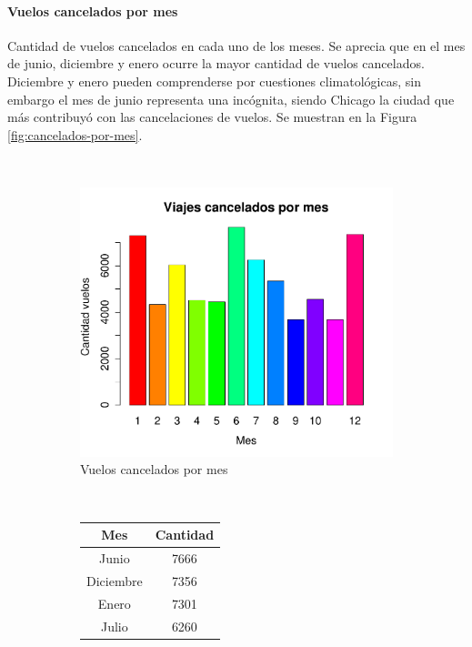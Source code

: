 \documentclass[12pt]{article}
\numberwithin{equation}{section}
\numberwithin{table}{section}
\numberwithin{figure}{section}
\begin{document}
\paragraph{Vuelos cancelados por mes}
Cantidad de vuelos cancelados en cada uno de los meses.
Se aprecia que en el mes de junio, diciembre y enero ocurre la mayor cantidad de vuelos cancelados.
Diciembre y enero pueden comprenderse por cuestiones climatológicas, sin embargo el mes de junio representa una incógnita, siendo Chicago la ciudad que más contribuyó con las cancelaciones de vuelos. Se muestran en la Figura \ref{fig:cancelados-por-mes}.

\begin{figure}
        \centering
        ~
        \begin{subfigure}[b]{0.6\textwidth}
                \includegraphics[width=1\columnwidth]{imagenes/cancelados/viajes-cancelados-por-mes}
                \caption{Vuelos cancelados por mes}
        \end{subfigure}
        ~
        \begin{subfigure}[b]{0.3\textwidth}
                \begin{tabular}{@{}cc@{}}
\toprule
\textbf{Mes} & \textbf{Cantidad} \\ \midrule
Junio        & 7666              \\
Diciembre    & 7356              \\
Enero        & 7301              \\
Julio        & 6260              \\

\end{tabular}
\end{subfigure}
\end{figure}
\end{document}
